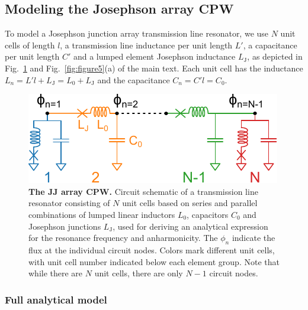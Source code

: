 \subsection{Modeling the Josephson array CPW}\label{sec:optimized}

To model a Josephson junction array transmission line resonator, we use $N$ unit cells of length $l$, a transmission line inductance per unit length $L'$, a capacitance per unit length $C'$ and a lumped element Josephson inductance $L_\text{J}$, as depicted in Fig.~\ref{fig:JJCPW-sketch} and Fig.~\ref{fig:figure5}(a) of the main text.
%
Each unit cell has the inductance $L_n = L' l + L_\text{J}=L_0+L_\text{J}$ and the capacitance $C_n = C'l = C_0$.

\begin{figure}[h]
	\centering
	\includegraphics[width=.5\linewidth]{chapter-currentdetection/figures/SM_anharmonicity_circuit}
	\caption{
		\textbf{The JJ array CPW.}
		Circuit schematic of a transmission line resonator consisting of $N$ unit cells based on series and parallel combinations of lumped linear inductors $L_0$, capacitors $C_0$ and Josephson junctions $L_\text{J}$, used for deriving an analytical expression for the resonance frequency and anharmonicity.
		The $\phi_n$ indicate the flux at the individual circuit nodes.
		Colors mark different unit cells, with unit cell number indicated below each element group.
		Note that while there are $N$ unit cells, there are only $N-1$ circuit nodes.
	}
	\label{fig:JJCPW-sketch}
\end{figure}

\subsubsection{Full analytical model}\label{sec:analytical}

